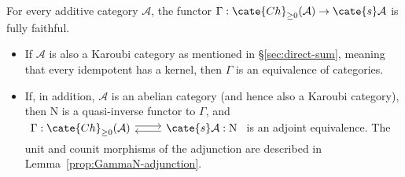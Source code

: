 
\hypertarget{o014.aljabr2.chapter8.dold-kan-b}{ }
\begin{theorem}\label{prop:Dold-Kan}
	For every additive category $\mathcal{A}$, the functor
	$\Gamma:\cate{Ch}_{\geq0}(\mathcal{A})\to\cate{s}\mathcal{A}$ is fully
	faithful.
	\begin{itemize}
		\item If $\mathcal{A}$ is also a Karoubi category as mentioned in
		\S\ref{sec:direct-sum}, meaning that every idempotent has a kernel,
		then $\Gamma$ is an equivalence of categories.
		\item If, in addition, $\mathcal{A}$ is an abelian category (and hence
		also a Karoubi category), then $\mathrm{N}$ is a quasi-inverse functor
		to $\Gamma$, and
		$\begin{tikzcd}
			\Gamma: \cate{Ch}_{\geq 0}(\mathcal{A}) \arrow[shift left, r] & \cate{s}\mathcal{A} : \mathrm{N} \arrow[shift left, l]
		\end{tikzcd}$
		is an adjoint equivalence. The unit and counit morphisms of the
		adjunction are described in Lemma~\ref{prop:GammaN-adjunction}.
	\end{itemize}
\end{theorem}
